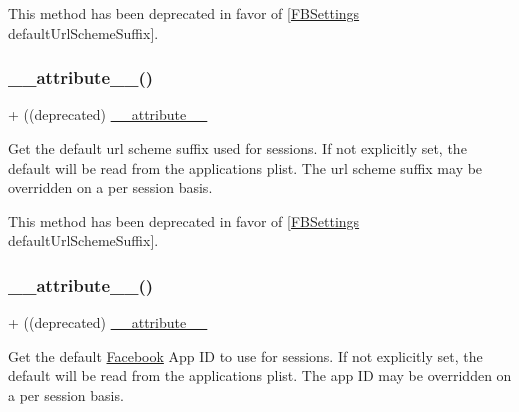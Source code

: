 This method has been deprecated in favor of \mbox{[}\hyperlink{interfaceFBSettings}{F\+B\+Settings} default\+Url\+Scheme\+Suffix\mbox{]}. \mbox{\label{interfaceFBSession_aab7b90337909b905920a4067b5253c2b}} 
\subsubsection{\texorpdfstring{\+\_\+\+\_\+attribute\+\_\+\+\_\+()}{\_\_attribute\_\_()}\hspace{0.1cm}{\footnotesize\ttfamily [22/25]}}
{\footnotesize\ttfamily + ((deprecated) \hyperlink{struct____attribute____}{\+\_\+\+\_\+attribute\+\_\+\+\_\+} \begin{DoxyParamCaption}{ }\end{DoxyParamCaption}}

Get the default url scheme suffix used for sessions. If not explicitly set, the default will be read from the application\textquotesingle{}s plist. The url scheme suffix may be overridden on a per session basis.

This method has been deprecated in favor of \mbox{[}\hyperlink{interfaceFBSettings}{F\+B\+Settings} default\+Url\+Scheme\+Suffix\mbox{]}. \mbox{\label{interfaceFBSession_aab7b90337909b905920a4067b5253c2b}} 
\subsubsection{\texorpdfstring{\+\_\+\+\_\+attribute\+\_\+\+\_\+()}{\_\_attribute\_\_()}\hspace{0.1cm}{\footnotesize\ttfamily [23/25]}}
{\footnotesize\ttfamily + ((deprecated) \hyperlink{struct____attribute____}{\+\_\+\+\_\+attribute\+\_\+\+\_\+} \begin{DoxyParamCaption}{ }\end{DoxyParamCaption}}

Get the default \hyperlink{interfaceFacebook}{Facebook} App ID to use for sessions. If not explicitly set, the default will be read from the application\textquotesingle{}s plist. The app ID may be overridden on a per session basis.


